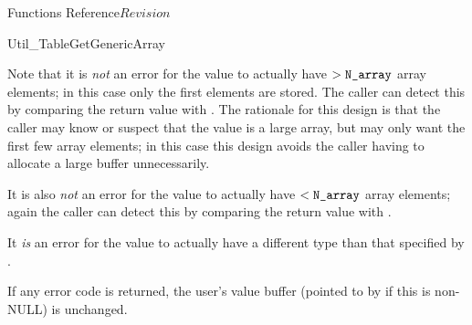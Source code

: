 \begin{cactuspart}{ Functions Reference}{}{$Revision$}
\begin{FunctionDescription}{Util\_TableGetGenericArray}
\begin{Discussion}
Note that it is {\em not\/} an error for the value to actually have
$> \mbox{\texttt{N\_array}}$ array elements; in this case only the first 
elements are stored.  The caller can detect this by comparing the
return value with .
The rationale for this design is that the caller may know or suspect
that the value is a large array, but may only want the first few array
elements; in this case this design avoids the caller having to allocate
a large buffer unnecessarily.

It is also {\em not\/} an error for the value to actually have
$< \mbox{\texttt{N\_array}}$ array elements; again the caller can detect this by
comparing the return value with .

It {\em is\/} an error for the value to actually have a different type
than that specified by .

If any error code is returned, the user's value buffer
(pointed to by  if this is non-NULL) is unchanged.
\end{Discussion}


\end{FunctionDescription}
\end{cactuspart}
